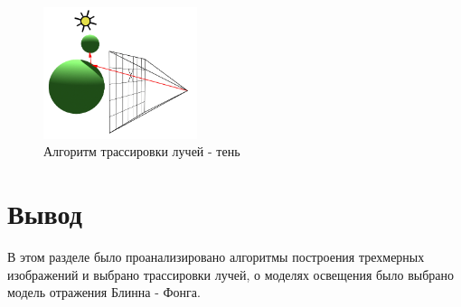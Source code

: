 \begin{figure}[ht]
  \centering
  \includegraphics[width=0.4\textwidth]{img/shadow_ray.png}
  \caption{Алгоритм трассировки лучей - тень}
\end{figure}


\section{Вывод}

В этом разделе было проанализировано алгоритмы построения трехмерных изображений
и выбрано трассировки лучей, о моделях освещения было выбрано модель отражения Блинна - Фонга.
